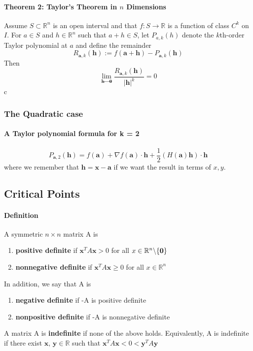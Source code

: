 \documentclass[11pt]{article}
\newcommand{\tb}[1]{\textbf{#1}}
\newcommand{\real}[0]{\mathbb{R}}
\newcommand{\vo}[0]{\tb{0}}
\newcommand{\va}[0]{\tb{a}}
\newcommand{\vh}[0]{\tb{h}}
\begin{document}
\paragraph{Theorem 2: Taylor's Theorem in $n$ Dimensions}Assume $S \subset \real^n$ is an open interval and that $f: S \rightarrow \real$ is a function of class $C^k$ on $I$. For $a \in S$ and $h \in \real^n$ such that $a+h\in S$, let $P_{a,k}(h)$ denote the $k$th-order Taylor polynomial at $a$ and define the remainder
$$R_{\va,k}(\vh) := f(\va+\vh) - P_{\va,k}(\vh)$$
Then $$\lim_{\vh\rightarrow\vo}\frac{R_{\va,k}(\vh)}{|\vh|^k} = 0$$
c
\subsubsection{The Quadratic case}
\paragraph{A Taylor polynomial formula for k = 2}
\begin{equation*}
P_{\tb{a},2}(\tb{h}) = f(\tb{a}) + \nabla f(\tb{a})\cdot \tb{h} + \frac{1}{2}(H(\tb{a})\tb{h})\cdot \tb{h}
\end{equation*}
where we remember that $\tb{h} = \tb{x} - \tb{a}$ if we want the result in terms of $x,y$. 

\subsection{Critical Points}
\paragraph{Definition} A symmetric $n \times n$ matrix A is
\begin{enumerate}
    \item \tb{positive definite} if $\tb{x}^T A \tb{x} > 0$ for all $x \in \real^n \symbol{92} \{\tb{0}\}$
    \item \tb{nonnegative definite} if $\tb{x}^T A \tb{x} \geq 0$ for all $x \in \real^n$
\end{enumerate}
In addition, we say that A is
\begin{enumerate}
    \item \tb{negative definite} if -A is positive definite
    \item \tb{nonpositive definite} if -A is nonnegative definite
\end{enumerate}
A matrix A is \tb{indefinite} if none of the above holds. Equivalently, A is indefinite if there exist $\tb{x, y}\in \real$ such that $\tb{x}^TA\tb{x} < 0 < \tb{y}^TA\tb{y}$
\end{document}

